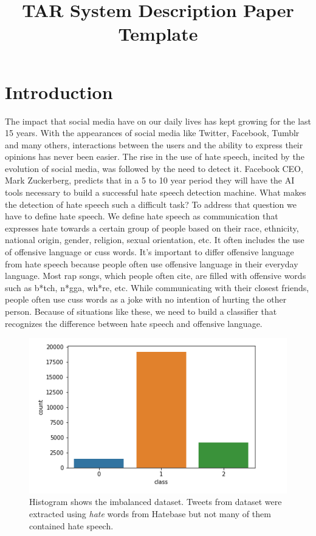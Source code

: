 \documentclass[10pt, a4paper]{article}
\title{TAR System Description Paper Template}
\begin{document}
\maketitleabstract

\section{Introduction}

The impact that social media have on our daily lives has kept growing for the last 15 years. With the appearances of social media like Twitter, Facebook, Tumblr and many others, interactions between the users and the ability to express their opinions has never been easier. The rise in the use of hate speech, incited by the evolution of social media, was followed by the need to detect it. Facebook CEO, Mark Zuckerberg, predicts that in a 5 to 10 year period they will have the AI tools necessary to build a successful hate speech detection machine. What makes the detection of hate speech such a difficult task? To address that question we have to define hate speech. We define hate speech as communication that expresses hate towards a certain group of people based on their race, ethnicity, national origin, gender, religion, sexual orientation, etc. It often includes the use of offensive language or cuss words. It's important to differ offensive language from hate speech because people often use offensive language in their everyday language. Most rap songs, which people often cite, are filled with offensive words such as b*tch, n*gga, wh*re, etc. While communicating with their closest friends, people often use cuss words as a joke with no intention of hurting the other person. Because of situations like these, we need to build a classifier that recognizes the difference between hate speech and offensive language. 

\begin{figure}[h]
	\includegraphics[width=1.1\linewidth, height=0.25\textheight]{pictures/HistOfData}
	\caption[Histogram showing number of labeled classes]{Histogram shows the imbalanced dataset. Tweets from dataset were extracted using \textit{hate} words from Hatebase but not many of them contained hate speech.}
	\label{fig:histofdata}
\end{figure}
\end{document}
